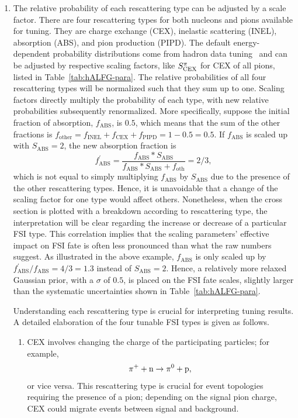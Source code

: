 \begin{enumerate}
\item 
The relative probability of each rescattering type can be adjusted by a scale factor. There are four rescattering types for both nucleons and pions available for tuning. They are charge exchange (CEX), inelastic scattering (INEL), absorption (ABS), and pion production (PIPD). The default energy-dependent probability distributions come from hadron data tuning~\cite{LADS:1999dyv,Navon:1983xj,Carroll:1976hj,Clough:1974qt,BAUHOFF1986429} and can be adjusted by respective scaling factors, like $S_\textrm{CEX}^{\pi}$ for CEX of all pions, listed in Table~\ref{tab:hALFG-para}. The relative probabilities of all four rescattering types will be normalized such that they sum up to one. Scaling factors directly multiply  the probability of each type, with new relative probabilities subsequently renormalized. More specifically, suppose the initial fraction of absorption, $f_\textrm{ABS}$, is $0.5$, which means that the sum of the other fractions is  $f_\textrm{other}=f_\textrm{INEL}+f_\textrm{CEX}+f_\textrm{PIPD}=1-0.5=0.5$. If $f_\textrm{ABS}$ is scaled up with $S_\textrm{ABS}=2$, the new absorption fraction is 
\begin{equation}
    f^\prime_\textrm{ABS} = \frac{f_\textrm{ABS}*S_\textrm{ABS}}{f_\textrm{ABS}*S_\textrm{ABS}+f_\textrm{oth}} = 2/3,
\end{equation}
which is not equal to simply multiplying $f_\textrm{ABS}$ by $S_\textrm{ABS}$ due to the presence of the other rescattering types. Hence, it is unavoidable that a change of the scaling factor for one type would affect others. Nonetheless, when the cross section is plotted with a breakdown according to rescattering type, the interpretation will be clear regarding the increase or decrease of a particular FSI type. This correlation implies that the scaling parameters' effective impact on FSI fate is often less pronounced than what the raw numbers suggest. As illustrated in the above example, $f_\textrm{ABS}$ is only scaled up by $ f^\prime_\textrm{ABS}/f_\textrm{ABS}=4/3=1.3$ instead of $S_\textrm{ABS}=2$. Hence, a relatively more relaxed Gaussian prior, with a $\sigma$ of $0.5$, is placed on the FSI fate scales, slightly larger than the systematic uncertainties shown in Table~\ref{tab:hALFG-para}. 

Understanding each rescattering type is crucial for interpreting tuning results. A detailed elaboration of the four tunable FSI types is given as follows. 

\begin{enumerate}
    \item 
CEX involves changing the charge of the participating particles; for example,
\begin{equation}
    \pi^+ + \textrm{n} \rightarrow \pi^0 + \textrm{p},
\end{equation}
or vice versa. This rescattering type is crucial for event topologies requiring the presence of a pion;  depending on the signal pion charge, CEX could migrate events between signal and background. 


\end{enumerate}
\end{enumerate}
